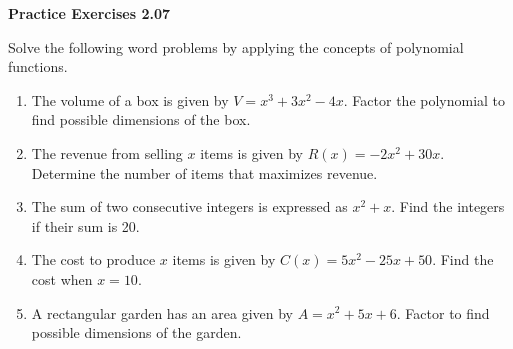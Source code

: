 \vspace{0.3ex}
\noindent\textbf{Practice Exercises 2.07}

\vspace{0.2ex}

Solve the following word problems by applying the concepts of polynomial functions.

\begin{enumerate}
    \item The volume of a box is given by $V = x^3 + 3x^2 - 4x$. Factor the polynomial to find possible dimensions of the box.
    \item The revenue from selling $x$ items is given by $R(x) = -2x^2 + 30x$. Determine the number of items that maximizes revenue.
    \item The sum of two consecutive integers is expressed as $x^2 + x$. Find the integers if their sum is 20.
    \item The cost to produce $x$ items is given by $C(x) = 5x^2 - 25x + 50$. Find the cost when $x = 10$.
    \item A rectangular garden has an area given by $A = x^2 + 5x + 6$. Factor to find possible dimensions of the garden.
\end{enumerate}
